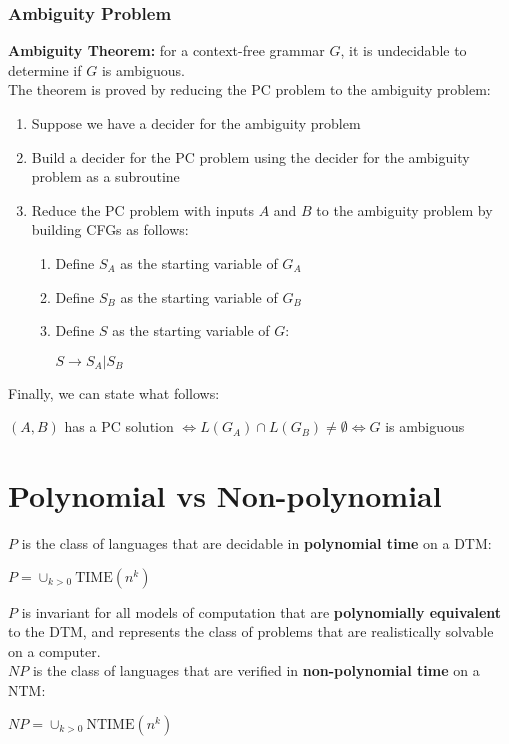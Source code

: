 \documentclass{article}
\begin{document}
\subsubsection{Ambiguity Problem}
\textbf{Ambiguity Theorem:} for a context-free grammar $G$, it is undecidable to determine if $G$ is ambiguous. \\
The theorem is proved by reducing the PC problem to the ambiguity problem:
\begin{enumerate}
    \item Suppose we have a decider for the ambiguity problem
    \item Build a decider for the PC problem using the decider for the ambiguity problem as a subroutine
    \item Reduce the PC problem with inputs $A$ and $B$ to the ambiguity problem by building CFGs as follows: 
        \begin{enumerate}
            \item Define $S_A$ as the starting variable of $G_A$
            \item Define $S_B$ as the starting variable of $G_B$
            \item Define $S$ as the starting variable of $G$:
                \begin{center}
                    $S \rightarrow S_A |S_B$
                \end{center}
        \end{enumerate}
\end{enumerate}
Finally, we can state what follows:
\begin{center}
    $(A,B)$ has a PC solution $\Leftrightarrow L(G_A) \cap L(G_B) \neq \emptyset \Leftrightarrow G$ is ambiguous  
\end{center}

\section{Polynomial vs Non-polynomial}
$P$ is the class of languages that are decidable in \textbf{polynomial time} on a DTM:
\begin{center}
    $P = \displaystyle\cup_{k>0}\text{TIME}(n^k)$
\end{center}
$P$ is invariant for all models of computation that are \textbf{polynomially equivalent} to the DTM, and represents the class of problems that are realistically solvable on a computer. \\
$NP$ is the class of languages that are verified in \textbf{non-polynomial time} on a NTM:
\begin{center}
    $NP = \displaystyle\cup_{k>0}\text{NTIME}(n^k)$
\end{center}
\end{document}

